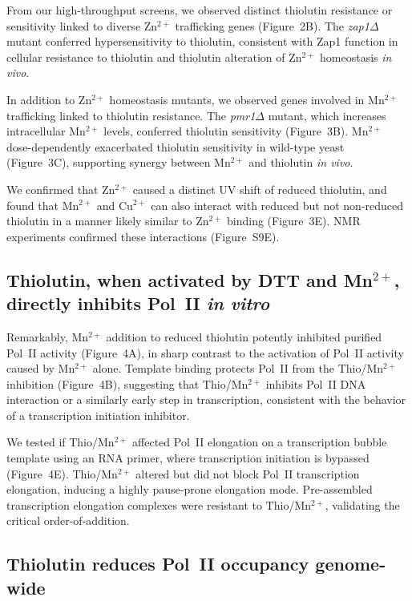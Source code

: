 \documentclass[11pt]{article}
\begin{document}
From our high-throughput screens, we observed distinct thiolutin resistance or sensitivity linked to diverse Zn$^{2+}$ trafficking genes (Figure~2B). The \textit{zap1$\Delta$} mutant conferred hypersensitivity to thiolutin, consistent with Zap1 function in cellular resistance to thiolutin and thiolutin alteration of Zn$^{2+}$ homeostasis \textit{in vivo}.

In addition to Zn$^{2+}$ homeostasis mutants, we observed genes involved in Mn$^{2+}$ trafficking linked to thiolutin resistance. The \textit{pmr1$\Delta$} mutant, which increases intracellular Mn$^{2+}$ levels, conferred thiolutin sensitivity (Figure~3B). Mn$^{2+}$ dose-dependently exacerbated thiolutin sensitivity in wild-type yeast (Figure~3C), supporting synergy between Mn$^{2+}$ and thiolutin \textit{in vivo}.

We confirmed that Zn$^{2+}$ caused a distinct UV shift of reduced thiolutin, and found that Mn$^{2+}$ and Cu$^{2+}$ can also interact with reduced but not non-reduced thiolutin in a manner likely similar to Zn$^{2+}$ binding (Figure~3E). NMR experiments confirmed these interactions (Figure~S9E).

\subsection{Thiolutin, when activated by DTT and Mn$^{2+}$, directly inhibits Pol~II \textit{in vitro}}

Remarkably, Mn$^{2+}$ addition to reduced thiolutin potently inhibited purified Pol~II activity (Figure~4A), in sharp contrast to the activation of Pol~II activity caused by Mn$^{2+}$ alone. Template binding protects Pol~II from the Thio/Mn$^{2+}$ inhibition (Figure~4B), suggesting that Thio/Mn$^{2+}$ inhibits Pol~II DNA interaction or a similarly early step in transcription, consistent with the behavior of a transcription initiation inhibitor.

We tested if Thio/Mn$^{2+}$ affected Pol~II elongation on a transcription bubble template using an RNA primer, where transcription initiation is bypassed (Figure~4E). Thio/Mn$^{2+}$ altered but did not block Pol~II transcription elongation, inducing a highly pause-prone elongation mode. Pre-assembled transcription elongation complexes were resistant to Thio/Mn$^{2+}$, validating the critical order-of-addition.

\subsection{Thiolutin reduces Pol~II occupancy genome-wide}
\end{document}
